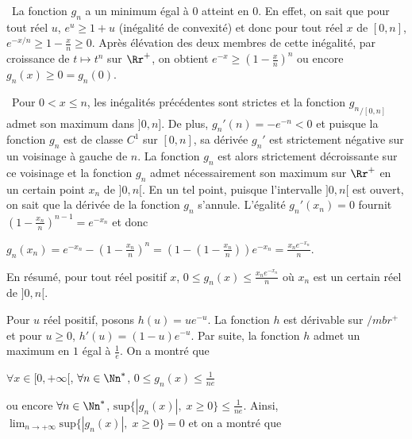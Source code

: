 {\begin{enumerate}
{\textbullet~La fonction $g_n$ a un minimum égal à $0$ atteint en $0$. En effet, on sait que pour tout réel $u$, $e^u\geqslant 1+u$ (inégalité de convexité) et donc pour tout réel $x$ de $[0,n]$,  $e^{-x/n}\geqslant 1-\frac{x}{n}\geqslant 0$. Après élévation des deux membres de cette inégalité, par croissance de $t\mapsto t^n$ sur $\Rr^+$, on obtient $e^{-x}\geqslant\left(1-\frac{x}{n}\right)^n$ ou encore $g_n(x)\geqslant 0 = g_n(0)$.

\textbullet~Pour $0 < x\leqslant n$, les inégalités précédentes sont strictes et la fonction ${g_n}_{/[0,n]}$ admet son maximum dans $]0,n]$. De plus, $g_n'(n)=-e^{-n}< 0$ et puisque la fonction $g_n$ est de classe $C^1$ sur $[0,n]$, sa dérivée $g_n'$ est strictement négative sur un voisinage à gauche de $n$. La fonction $g_n$ est alors strictement décroissante sur ce voisinage et la fonction $g_n$ admet nécessairement son maximum sur $\Rr^+$ en un certain point $x_n$ de $]0,n[$. En un tel point, puisque l'intervalle $]0,n[$ est ouvert, on sait que la dérivée de la fonction $g_n$ s'annule. L'égalité $g_n'(x_n) = 0$ fournit $\left(1-\frac{x_n}{n}\right)^{n-1}=e^{-x_n}$ et donc 

\begin{center}
$g_n(x_n) =e^{-x_n}-\left(1-\frac{x_n}{n}\right)^n =\left(1-\left(1-\frac{x_n}{n}\right)\right)e^{-x_n}=  \frac{x_ne^{-x_n}}{n}$.
\end{center}

En résumé, pour tout réel positif $x$, $0\leqslant g_n(x)\leqslant\frac{x_ne^{-x_n}}{n}$ où $x_n$ est un certain réel de $]0,n[$.

Pour $u$ réel positif, posons $h(u) = ue^{-u}$. La fonction $h$ est dérivable sur $/mbr^+$ et pour $u\geqslant0$, $h'(u) = (1-u)e^{-u}$. Par suite, la fonction $h$ admet un maximum en $1$ égal à $\frac{1}{e}$. On a montré que

\begin{center}
$\forall x\in[0,+\infty[$, $\forall n\in\Nn^*$, $0\leqslant g_n(x)\leqslant\frac{1}{ne}$
\end{center}

ou encore
$\forall n\in\Nn^*$, $\text{sup}\{|g_n(x)|,\;x\geqslant 0\}\leqslant\frac{1}{ne}$. Ainsi, $\lim_{n \rightarrow +\infty}\text{sup}\{|g_n(x)|,\;x\geqslant 0\}=0$ et on a montré que
 
 
\begin{center}
\end{center}

}
\end{enumerate}}
